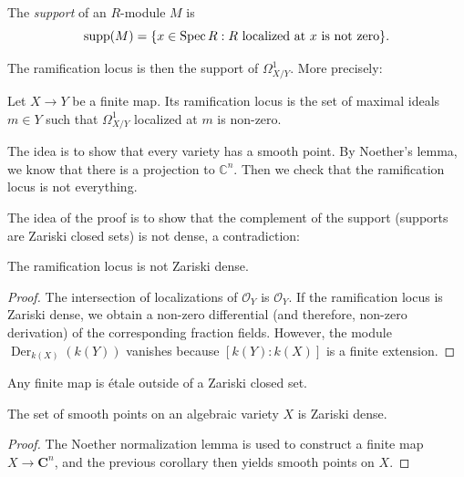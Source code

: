 \begin{definition}
\label{definition-support}
The {\it support} of an $R$-module $M$ is
$$
\text{supp}(M)
=
\{x \in \mathop{\mathrm{Spec}} R
:R \text{ localized at $x$ is not zero}\}.
$$
\end{definition}

\noindent
The ramification locus is then
the support of $\Omega_{X/Y}^1$.
More precisely:

\begin{definition}
\label{definition-ramification-locus}
Let $X \to Y$ be a finite map. Its
ramification locus is the set of maximal
ideals $m \in Y$ such that
$\Omega^1_{X/Y}$
localized at $m$ is non-zero.
\end{definition}

\noindent
The idea is to show that every
variety has a smooth point.
By Noether's lemma, we know that
there is a projection to $\mathbb{C}^n$.
Then we check that the ramification
locus is not everything.

The idea of the proof is to show
that the complement of the support
(supports are Zariski closed sets)
is not dense, a contradiction:

\begin{proposition}
\label{proposition-ramification-locus-not-dense}
The ramification locus is not Zariski dense.
\end{proposition}

\begin{proof}
The intersection of localizations of
$\mathcal O_Y$ is $\mathcal O_Y$. If the
ramification locus is Zariski dense, we
obtain a non-zero differential (and
therefore, non-zero derivation) of the
corresponding fraction fields. However, the
module $\operatorname{Der}_{k(X)}(k(Y))$
vanishes because
$[k(Y):k(X)]$ is a finite extension.
\end{proof}

\begin{corollary}
\label{lemma-finite-map-etale-outside-closed}
Any finite map is \'etale outside of a
Zariski closed set.
\end{corollary}

\begin{corollary}
\label{lemma-smooth-points-zariski-dense}
The set of smooth points on an algebraic
variety $X$ is Zariski dense.
\end{corollary}

\begin{proof}
The Noether normalization lemma is used to
construct a finite map $X \to \mathbf{C}^n$,
and the previous corollary then yields
smooth points on $X$.
\end{proof}





